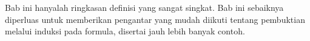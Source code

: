 \documentclass[../../../include/open-logic-chapter]{subfiles}
\begin{document}

\begin{editorial}
  Bab ini hanyalah ringkasan definisi yang sangat singkat. Bab ini
  sebaiknya diperluas untuk memberikan pengantar yang mudah diikuti
  tentang pembuktian melalui induksi pada formula, disertai jauh lebih
  banyak contoh.
\end{editorial}







\OLEndChapterHook
\end{document}
